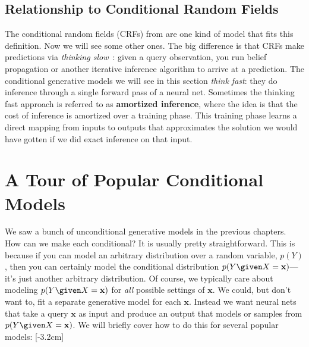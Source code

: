 \subsection{Relationship to Conditional Random Fields} 
The conditional random fields (CRFs) from \chap{\ref{chapter:probabilistic_graphical_models}} are one kind of model that fits this definition. Now we will see some other ones. The big difference is that CRFs make predictions via \textit{thinking slow}~\cite{kahneman2011thinking}: given a query observation, you run belief propagation or another iterative inference algorithm to arrive at a prediction. The conditional generative models we will see in this section \textit{think fast}: they do inference through a single forward pass of a neural net. Sometimes the thinking fast approach is referred to as \textbf{amortized inference}, where the idea is that the cost of inference is amortized over a training phase. This training phase learns a direct mapping from inputs to outputs that approximates the solution we would have gotten if we did exact inference on that input.


\section{A Tour of Popular Conditional Models}
We saw a bunch of unconditional generative models in the previous chapters. How can we make each conditional? It is usually pretty straightforward. This is because if you can model an arbitrary distribution over a random variable, $p(Y)$, then you can certainly model the conditional distribution $p(Y \given X=\mathbf{x})$—it's just another arbitrary distribution. Of course, we typically care about modeling $p(Y \given X=\mathbf{x})$ for \textit{all} possible settings of $\mathbf{x}$. We could, but don't want to, fit a separate generative model for each $\mathbf{x}$. Instead we want neural nets that take a query $\mathbf{x}$ as input and produce an output that models or samples from $p(Y \given X=\mathbf{x})$. We will briefly cover how to do this for several popular models:
[-3.2cm]


